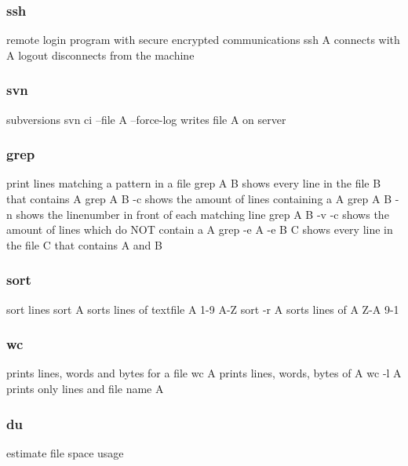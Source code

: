 \documentclass[10pt,a4paper]{scrartcl}
\begin{document}
\begin{description}
\subsubsection{ssh}
\begin{terminalcode}
remote login program with secure encrypted communications
ssh A connects with A
logout disconnects from the machine
\end{terminalcode}

\subsubsection{svn}
\begin{terminalcode}
subversions
svn ci --file A --force-log writes file A on server
\end{terminalcode}

\subsubsection{grep}
\begin{terminalcode}
print lines matching a pattern in a file
grep A B shows every line in the file B that contains A
grep A B -c shows the amount of lines containing a A
grep A B -n shows the linenumber in front of each matching line
grep A B -v -c shows the amount of lines which do NOT contain a A
grep -e A -e B C shows every line in the file C that contains A and B
\end{terminalcode}

\subsubsection{sort}
\begin{terminalcode}
sort lines
sort A sorts lines of textfile A 1-9 A-Z
sort -r A sorts lines of A Z-A 9-1
\end{terminalcode}

\subsubsection{wc}
\begin{terminalcode}
prints lines, words and bytes for a file
wc A prints lines, words, bytes of A
wc -l A prints only lines and file name A
\end{terminalcode}

\subsubsection{du}
\begin{terminalcode}
estimate file space usage
\end{terminalcode}


\end{description}
\end{document}
